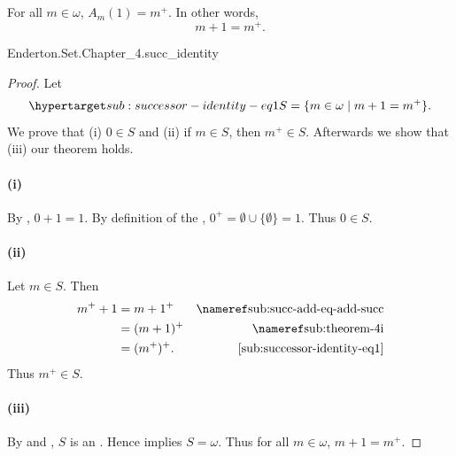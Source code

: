 \documentclass{report}
\begin{document}
\subsection{}%

  \begin{lemma}
    For all $m \in \omega$, $A_m(1) = m^+$.
    In other words, $$m + 1 = m^+.$$
  \end{lemma}

    {Enderton.Set.Chapter\_4.succ\_identity}


  \begin{proof}

    Let
      \begin{equation}
        \hyperlabel{sub:successor-identity-eq1}
        S = \{m \in \omega \mid m + 1 = m^+\}.
      \end{equation}
    We prove that (i) $0 \in S$ and (ii) if $m \in S$, then $m^+ \in S$.
    Afterwards we show that (iii) our theorem holds.

    \paragraph{(i)}%

      By , $0 + 1 = 1$.
      By definition of the ,
        $0^+ = \emptyset \cup \{\emptyset\} = 1$.
      Thus $0 \in S$.

    \paragraph{(ii)}%

      Let $m \in S$.
      Then
        \begin{align*}
          m^+ + 1
            & = m + 1^+ & \textref{sub:succ-add-eq-add-succ} \\
            & = (m + 1)^+ & \textref{sub:theorem-4i} \\
            & = (m^+)^+. & \eqref{sub:successor-identity-eq1}
        \end{align*}
      Thus $m^+ \in S$.

    \paragraph{(iii)}%

      By  and
        , $S$ is an
        .
      Hence  implies $S = \omega$.
      Thus for all $m \in \omega$, $m + 1 = m^+$.

  \end{proof}
\end{document}
